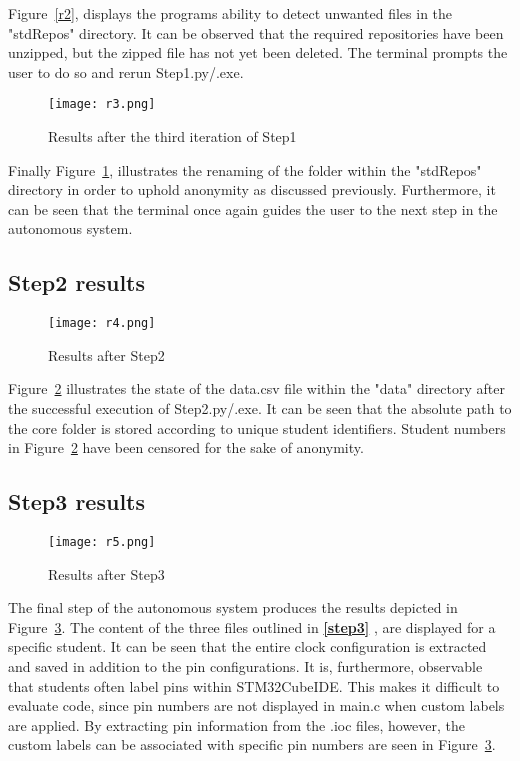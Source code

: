 Figure~\ref{r2}, displays the programs ability to detect unwanted files in the "stdRepos" directory. It can be observed that the required repositories have been unzipped, but the zipped file has not yet been deleted. The terminal prompts the user to do so and rerun Step1.py/.exe.

\begin{figure}[H]
\begin{center}
\texttt{[image: r3.png]}
\caption{Results after the third iteration of Step1}
\label{r3}
\end{center}
\end{figure}

Finally Figure~\ref{r3}, illustrates the renaming of the folder within the "stdRepos" directory in order to uphold anonymity as discussed previously. Furthermore, it can be seen that the terminal once again guides the user to the next step in the autonomous system.

\subsection{Step2 results}
\label{2res}

\begin{figure}[H]
\begin{center}
\texttt{[image: r4.png]}
\caption{Results after Step2}
\label{r4}
\end{center}
\end{figure}

Figure~\ref{r4} illustrates the state of the data.csv file within the "data" directory after the successful execution of Step2.py/.exe. It can be seen that the absolute path to the core folder is stored according to unique student identifiers. Student numbers in Figure~\ref{r4} have been censored for the sake of anonymity.

\subsection{Step3 results}
\label{3res}

\begin{figure}[H]
\begin{center}
\texttt{[image: r5.png]}
\caption{Results after Step3}
\label{r5}
\end{center}
\end{figure}

The final step of the autonomous system produces the results depicted in Figure~\ref{r5}. The content of the three files outlined in \textbf{\ref{step3} }, are displayed for a specific student. It can be seen that the entire clock configuration is extracted and saved in addition to the pin configurations. It is, furthermore, observable that students often label pins within STM32CubeIDE. This makes it difficult to evaluate code, since pin numbers are not displayed in main.c when custom labels are applied. By extracting pin information from the .ioc files, however, the custom labels can be associated with specific pin numbers are seen in Figure~\ref{r5}.